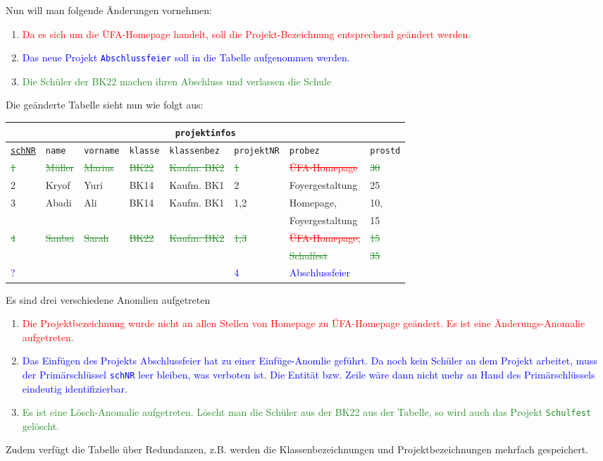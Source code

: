 Nun will man folgende Änderungen vornehmen:
\begin{enumerate}
	\item \textcolor{red}{Da es sich um die ÜFA-Homepage handelt, soll die Projekt-Bezeichnung entsprechend geändert werden.}
	\item \textcolor{blue}{Das neue Projekt \texttt{Abschlussfeier} soll in die Tabelle aufgenommen werden.}
	\item \textcolor{ForestGreen}{Die Schüler der BK22 machen ihren Abschluss und verlassen die Schule}
\end{enumerate}
Die geänderte Tabelle sieht nun wie folgt aus:
\begin{tabular}{llllllll}
	\multicolumn{8}{c}{\lstinline!projektinfos!}\\
	\hline
	\underline{\lstinline!schNR!}&\lstinline!name!&\lstinline!vorname!&\lstinline!klasse!&\lstinline!klassenbez!&\lstinline!projektNR!&\lstinline!probez!&\lstinline!prostd!\\
	\hline
	\textcolor{ForestGreen}{\sout{1}} &
	\textcolor{ForestGreen}{\sout{Müller}} &
	\textcolor{ForestGreen}{\sout{Marius}} &
	\textcolor{ForestGreen}{\sout{BK22}} &
	\textcolor{ForestGreen}{\sout{Kaufm. BK2}}&
	\textcolor{ForestGreen}{\sout{1}} &
	\textcolor{red}{\sout{ÜFA-Homepage}} &
	\textcolor{ForestGreen}{\sout{30}} \\
	2 &
	Kryof  &
	Yuri &
	BK14 &
	Kaufm. BK1&
	2 &
	Foyergestaltung &
	25 \\
	3 &
	Abadi &
	Ali &
	BK14 &
	Kaufm. BK1&
	1,2 &
	Homepage,&
	10,\\
	&&&&&&Foyergestaltung&15\\
	\textcolor{ForestGreen}{\sout{4}}&
	\textcolor{ForestGreen}{\sout{Sanbei}}&
	\textcolor{ForestGreen}{\sout{Sarah}}&
	\textcolor{ForestGreen}{\sout{BK22}}&
	\textcolor{ForestGreen}{\sout{Kaufm. BK2}}&
	\textcolor{ForestGreen}{\sout{1,3}}&
	\textcolor{red}{\sout{ÜFA-Homepage,}}&
	\textcolor{ForestGreen}{\sout{15}}\\
	&&&&&&\textcolor{ForestGreen}{\sout{Schulfest}}&\textcolor{ForestGreen}{\sout{35}}\\
	\textcolor{blue}{?}&
	&
	&
	&
	&
	\textcolor{blue}{4} &
	\textcolor{blue}{Abschlussfeier}&
	\\
\end{tabular}\newpage
Es sind drei verschiedene Anomlien aufgetreten
\begin{enumerate}
	\item \textcolor{red}{Die Projektbezeichnung wurde nicht an allen Stellen von Homepage zu ÜFA-Homepage geändert. Es ist eine Änderungs-Anomalie aufgetreten.}
	\item \textcolor{blue}{Das Einfügen des Projekts Abschlussfeier hat zu einer Einfüge-Anomlie geführt. Da noch kein Schüler an dem Projekt arbeitet, muss der Primärschlüssel \lstinline!schNR! leer bleiben, was verboten ist. Die Entität bzw. Zeile wäre dann nicht mehr an Hand des Primärschlüssels eindeutig identifizierbar.}
	\item \textcolor{ForestGreen}{Es ist eine Lösch-Anomalie aufgetreten. Löscht man die Schüler aus der BK22 aus der Tabelle, so wird auch das Projekt \texttt{Schulfest} gelöscht.}
\end{enumerate}
Zudem verfügt die Tabelle über Redundanzen, z.B. werden die Klassenbezeichnungen und Projektbezeichnungen mehrfach gespeichert.